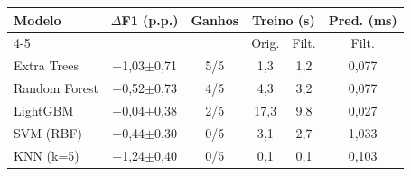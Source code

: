 \begin{tabular}{@{}lccccc@{}}
\toprule
Modelo & $\Delta$F1 (p.p.) & Ganhos & \multicolumn{2}{c}{Treino (s)} & Pred. (ms)\\
\cmidrule(lr){4-5}
 & & & Orig. & Filt. & Filt.\\
\midrule
Extra Trees & +1,03$\pm$0,71 & 5/5 & 1,3 & 1,2 & 0,077\\
Random Forest & +0,52$\pm$0,73 & 4/5 & 4,3 & 3,2 & 0,077\\
LightGBM & +0,04$\pm$0,38 & 2/5 & 17,3 & 9,8 & 0,027\\
SVM (RBF) & $-$0,44$\pm$0,30 & 0/5 & 3,1 & 2,7 & 1,033\\
KNN (k=5) & $-$1,24$\pm$0,40 & 0/5 & 0,1 & 0,1 & 0,103\\
\bottomrule
\end{tabular}
